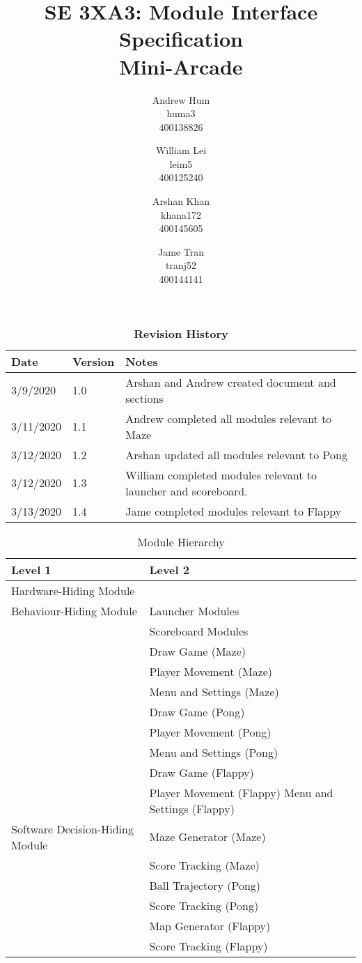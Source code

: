 \documentclass[12pt, titlepage]{article}
\title{SE 3XA3: Module Interface Specification\\Mini-Arcade}
\author{Andrew Hum \\ huma3 \\ 400138826 \and
		William Lei \\ leim5 \\ 400125240 \and
		Arshan Khan \\ khana172 \\ 400145605 \and
		Jame Tran \\ tranj52 \\ 400144141
}
\date{}
\begin{document}
\newpage

\maketitle
\maketitle
\newpage
\tableofcontents

\begin{table}[bp]
\caption{\bf Revision History}
\begin{tabularx}{\textwidth}{p{3cm}p{2cm}X}
\toprule {\bf Date} & {\bf Version} & {\bf Notes}\\
\midrule
3/9/2020 & 1.0 & Arshan and Andrew created document and sections\\
3/11/2020 & 1.1 & Andrew completed all modules relevant to Maze\\
3/12/2020 & 1.2 & Arshan updated all modules relevant to Pong\\
3/12/2020 & 1.3 & William completed modules relevant to launcher and scoreboard.\\
3/13/2020 & 1.4 & Jame completed modules relevant to Flappy
\bottomrule
\end{tabularx}
\end{table}

\newpage

\begin{table}[h!]
    \centering
    \begin{tabular}{p{} p{}}
    \toprule
    \textbf{Level 1} & \textbf{Level 2}\\
    \midrule
        {Hardware-Hiding Module} & ~ \\
    \midrule
        \multirow{1}{0.3\textwidth}{Behaviour-Hiding Module}
        & Launcher Modules\\
        & Scoreboard Modules\\
        & Draw Game (Maze)\\
        & Player Movement (Maze)\\
        & Menu and Settings (Maze)\\ 
        & Draw Game (Pong)\\
        & Player Movement (Pong)\\
        & Menu and Settings (Pong)\\ 
        & Draw Game (Flappy)\\
        & Player Movement (Flappy)
        Menu and Settings (Flappy)\\
    \midrule
        \multirow{1}{0.3\textwidth}{Software Decision-Hiding Module}
        & Maze Generator (Maze)\\
        & Score Tracking (Maze)\\ 
        & Ball Trajectory (Pong)\\
        & Score Tracking (Pong) \\ 
        & Map Generator (Flappy)\\
        & Score Tracking (Flappy)\\
    \bottomrule
\end{tabular}
\caption{Module Hierarchy}
\label{TblMH}
\end{table}
\end{document}

